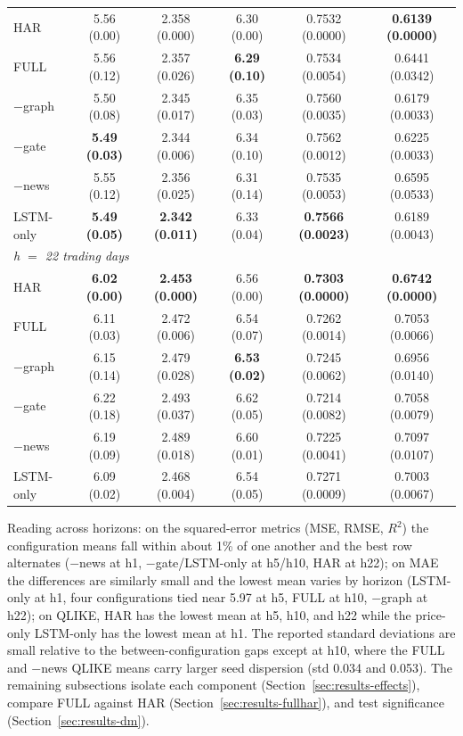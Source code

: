\documentclass[runningheads]{llncs}
\begin{document}
\begin{table}[t]
\begin{tabular}{lccccc}
HAR         & 5.56 (0.00) & 2.358 (0.000) & 6.30 (0.00) & 0.7532 (0.0000) & \textbf{0.6139 (0.0000)} \\
FULL        & 5.56 (0.12) & 2.357 (0.026) & \textbf{6.29 (0.10)} & 0.7534 (0.0054) & 0.6441 (0.0342) \\
$-$graph    & 5.50 (0.08) & 2.345 (0.017) & 6.35 (0.03) & 0.7560 (0.0035) & 0.6179 (0.0033) \\
$-$gate     & \textbf{5.49 (0.03)} & 2.344 (0.006) & 6.34 (0.10) & 0.7562 (0.0012) & 0.6225 (0.0033) \\
$-$news     & 5.55 (0.12) & 2.356 (0.025) & 6.31 (0.14) & 0.7535 (0.0053) & 0.6595 (0.0533) \\
LSTM-only   & \textbf{5.49 (0.05)} & \textbf{2.342 (0.011)} & 6.33 (0.04) & \textbf{0.7566 (0.0023)} & 0.6189 (0.0043) \\
\midrule
\multicolumn{6}{l}{\emph{h $=$ 22 trading days}} \\
HAR         & \textbf{6.02 (0.00)} & \textbf{2.453 (0.000)} & 6.56 (0.00) & \textbf{0.7303 (0.0000)} & \textbf{0.6742 (0.0000)} \\
FULL        & 6.11 (0.03) & 2.472 (0.006) & 6.54 (0.07) & 0.7262 (0.0014) & 0.7053 (0.0066) \\
$-$graph    & 6.15 (0.14) & 2.479 (0.028) & \textbf{6.53 (0.02)} & 0.7245 (0.0062) & 0.6956 (0.0140) \\
$-$gate     & 6.22 (0.18) & 2.493 (0.037) & 6.62 (0.05) & 0.7214 (0.0082) & 0.7058 (0.0079) \\
$-$news     & 6.19 (0.09) & 2.489 (0.018) & 6.60 (0.01) & 0.7225 (0.0041) & 0.7097 (0.0107) \\
LSTM-only   & 6.09 (0.02) & 2.468 (0.004) & 6.54 (0.05) & 0.7271 (0.0009) & 0.7003 (0.0067) \\
\bottomrule
\end{tabular}
\end{table}

Reading across horizons: on the squared-error metrics (MSE, RMSE, $R^2$) the configuration means fall
within about 1\% of one another and the best row alternates ($-$news at h1, $-$gate/LSTM-only at h5/h10,
HAR at h22); on MAE the differences are similarly small and the lowest mean varies by horizon (LSTM-only at
h1, four configurations tied near 5.97 at h5, FULL at h10, $-$graph at h22); on QLIKE, HAR has the lowest
mean at h5, h10, and h22 while the price-only LSTM-only has the lowest mean at h1. The reported standard
deviations are small relative to the between-configuration gaps except at h10, where the FULL and $-$news
QLIKE means carry larger seed dispersion (std 0.034 and 0.053). The remaining subsections isolate each
component (Section~\ref{sec:results-effects}), compare FULL against HAR (Section~\ref{sec:results-fullhar}),
and test significance (Section~\ref{sec:results-dm}).
\end{document}

